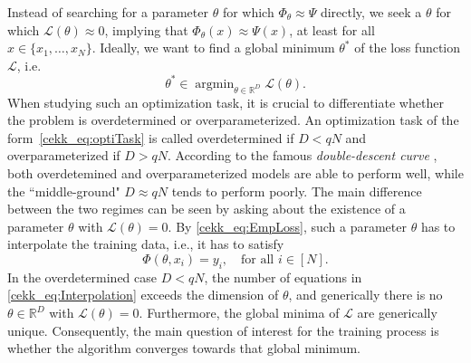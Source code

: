 \documentclass[10pt]{article}
\newcommand{\R}{{\mathbb R}}
\def\R{\mathbb{R}}
\begin{document}
Instead of searching for a parameter $\theta$ for which $\Phi_\theta \approx \Psi$ directly, we seek a $\theta$ for which $\mathcal L(\theta) \approx 0$, implying that $\Phi_\theta(x) \approx \Psi(x)$, at least for all $x \in \{x_1, \dots, x_N\}$.
Ideally, we want to find a global minimum $\theta^*$ of the loss function $\mathcal L$, i.e.
\begin{equation} \label{cekk_eq:optiTask}
	\theta^* \in \operatorname{argmin}_{\theta \in \R^D} \mathcal L(\theta).
\end{equation}
When studying such an optimization task, it is crucial to differentiate whether the problem is {overdetermined} or {overparameterized}. An optimization task of the form~\eqref{cekk_eq:optiTask} is called overdetermined if $D < qN$ and overparameterized if $D > qN$. According to the famous \emph{double-descent curve} \cite[Figure 1]{Belkin19}, both overdetemined and overparameterized models are able to perform well, while the ``middle-ground" $D \approx qN$ tends to perform poorly. The main difference between the two regimes can be seen by asking about the existence of a parameter $\theta$ with $\mathcal L(\theta) = 0$. By \eqref{cekk_eq:EmpLoss}, such a parameter $\theta$ has to interpolate the training data, i.e., it has to satisfy
\begin{equation}\label{cekk_eq:Interpolation}
	\Phi(\theta,x_i) = y_i, \quad \text{for all } i \in [N].
\end{equation}
In the overdetermined case $D<qN$, the number of equations in \eqref{cekk_eq:Interpolation} exceeds the dimension of $\theta$, and generically there is no $\theta \in \mathbb R^D$ with $\mathcal L(\theta) = 0$. Furthermore, the global minima of $\mathcal L$ are generically unique. Consequently, the main question of interest for the training process is whether the algorithm converges towards that global minimum.
\end{document}
